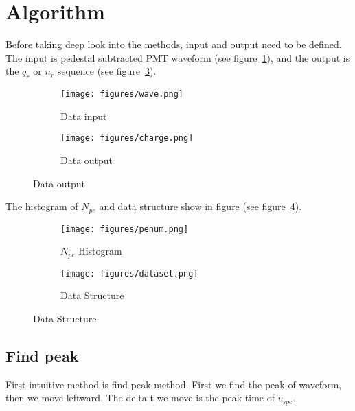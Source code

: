\section{Algorithm} %

Before taking deep look into the methods, input and output need to be defined. The input is pedestal subtracted PMT waveform (see figure~\ref{fig:input}), and the output is the $q_{r}$ or $n_{r}$ sequence (see figure~\ref{fig:output}). 

\begin{figure}[H]
\begin{minipage}{.5\textwidth}
\begin{figure}[H]
    \centering
        \texttt{[image: figures/wave.png]}
    \caption{\label{fig:input} Data input}
\end{figure}
\end{minipage}
\begin{minipage}{.5\textwidth}
\begin{figure}[H]
    \centering
        \texttt{[image: figures/charge.png]}
    \caption{\label{fig:output} Data output}
\end{figure}
\end{minipage}
\end{figure}

The histogram of $N_{pe}$ and data structure show in figure (see figure~\ref{fig:penum}). 

\begin{figure}[H]
\begin{minipage}{.5\textwidth}
\begin{figure}[H]
    \centering
        \texttt{[image: figures/penum.png]}
    \caption{\label{fig:penum} $N_{pe}$ Histogram}
\end{figure}
\end{minipage}
\begin{minipage}{.5\textwidth}
\begin{figure}[H]
    \centering
        \texttt{[image: figures/dataset.png]}
    \caption{\label{fig:set} Data Structure}
\end{figure}
\end{minipage}
\end{figure}

\subsection{Find peak}
First intuitive method is find peak method. First we find the peak of waveform, then we move leftward. The delta t we move is the peak time of $v_{spe}$. 

